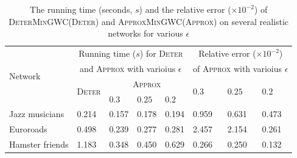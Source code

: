 \documentclass[10pt,twocolumn,twoside]{IEEEtran}
\begin{document}
\begin{table}[htbp]
    \normalsize
    \centering
    \fontsize{7.5}{8.0}\selectfont
    \begin{threeparttable}
        \caption{The running time (seconds, \(s\)) and the relative error (\(\times10^{-2}\)) of \textsc{DeterMinGWC}(\textsc{Deter}) and \textsc{ApproxMinGWC}(\textsc{Approx}) on several realistic networks for various \(\epsilon\)}
        \label{tab:running-time}
        \begin{tabularx}{8.75cm}{p{1.75cm}<{\centering} p{0.6cm}<{\centering} p{0.4cm}<{\centering} p{0.4cm}<{\centering} p{0.4cm}<{\centering} p{0.4cm}<{\centering} p{0.4cm}<{\centering} p{0.4cm}<{\centering}}
            \toprule[1pt]
            \multirow{4}{*}{Network}                                           &
            \multicolumn{4}{c}{Running time (\(s\)) for \textsc{Deter}}        &
            \multicolumn{3}{c}{Relative error (\(\times10^{-2}\))}                                                                            \\ &
            \multicolumn{4}{c}{and \textsc{Approx} with varioius \(\epsilon\)} &
            \multicolumn{3}{c}{of \textsc{Approx} with varioius \(\epsilon\)}                                                                 \\
            \cmidrule{2-8}                                                     &
            \multirow{2}{*}{\textsc{Deter}}                                    &
            \multicolumn{3}{c}{\textsc{Approx}}                                &
            \multirow{2}{*}{\(0.3\)}                                           &
            \multirow{2}{*}{\(0.25\)}                                          &
            \multirow{2}{*}{\(0.2\)}                                                                                                          \\
            \cmidrule{3-5}                                                     &       & \(0.3\) & \(0.25\) & \(0.2\) &       &       &       \\
            \midrule
            Jazz musicians                                                     & 0.214 & 0.157   & 0.178    & 0.194   & 0.959 & 0.631 & 0.473 \\
            Euroroads                                                          & 0.498 & 0.239   & 0.277    & 0.281   & 2.457 & 2.154 & 0.261 \\
            Hamster friends                                                    & 1.183 & 0.348   & 0.450    & 0.629   & 0.266 & 0.250 & 0.132 \\

\end{tabularx}
\end{threeparttable}
\end{table}
\end{document}
